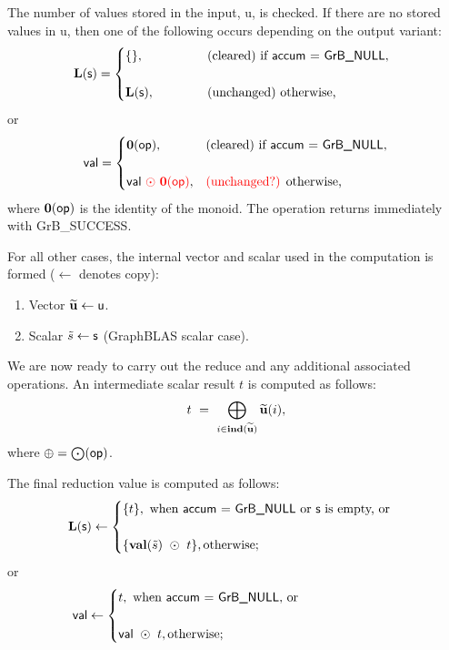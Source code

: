 The number of values stored in the input, {\sf u}, is checked.  If there are no stored values in {\sf u}, then one of the following occurs depending on the output variant:
\[ 
{\sf {\bf L}(s)} =
\begin{cases}
    \{\}, & \mbox{(cleared) if {\sf accum} = {\sf GrB\_NULL}}, ~~\\ & \\
    {\sf {\bf L}(s)}, ~~~ ~~~~~~~ & \mbox{(unchanged) otherwise,}
\end{cases}
\]
or
\[ 
{\sf val} =
\begin{cases}
    \bold{0}({\sf op}), & \mbox{(cleared) if {\sf accum} = {\sf GrB\_NULL}}, \\ & \\
    {\sf val}{\color{red} ~\odot~ {\bf 0}({\sf op})}, & \mbox{{\color{red}(unchanged?)} otherwise,}
\end{cases}
\]
where $\bold{0}({\sf op})$ is the identity of the monoid. The operation returns immediately with {\sf GrB\_SUCCESS}.

For all other cases, the internal vector and scalar used in 
the computation is formed ($\leftarrow$ denotes copy):
\begin{enumerate}
	\item Vector ${\bf \widetilde{u}} \leftarrow {\sf u}$.
    \item Scalar ${\tilde{s}} \leftarrow {\sf s}$ (GraphBLAS scalar case).
\end{enumerate}

We are now ready to carry out the reduce and any additional associated operations.  
An intermediate scalar result $t$ is computed as follows:
\[ 
t ~ = ~
    \bigoplus\limits_{i \in \bold{ind}({\bf \widetilde{u}})} {\bf \widetilde{u}}(i),
\]
where $\oplus = \bigodot({\sf op})$.

The final reduction value is computed as follows:
\[
{\sf {\bf L}(s)} \leftarrow
    \begin{cases}
    \{ t \}, \text{ when {\sf accum = GrB\_NULL} or {\sf s} is empty, or} \\ & \\
    \{ {\bf val}(\tilde{s}) ~\odot ~ t \}, \text{otherwise;} \\
    \end{cases}
\]
or 
\[
{\sf val} \leftarrow
    \begin{cases}
    t, \text{ when {\sf accum = GrB\_NULL}, or} \hspace*{0.95in} \\ & \\
    {\sf val} ~\odot ~t, \text{otherwise;} \\
    \end{cases}
\]

